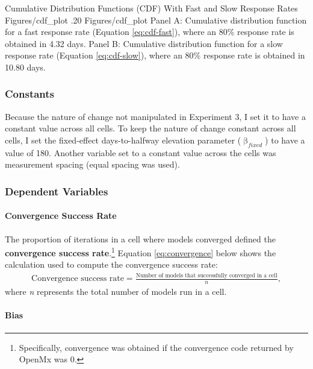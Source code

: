 \documentclass[
12pt, %
twoside,
english]{guelphthesis}
\theoremstyle{definition}
\theoremstyle{definition}
\theoremstyle{definition}
\theoremstyle{definition}
\theoremstyle{remark}
\begin{document}
\begin{apaFigure}
[portrait]
[samepage]
[0cm]
{Cumulative Distribution Functions (CDF) With Fast and Slow Response Rates}
{Figures/cdf_plot}
{.20}
{Figures/cdf_plot}
{Panel A: Cumulative distribution function for a fast response rate (Equation \ref{eq:cdf-fast}), where an 80\% response rate is obtained in 4.32 days. Panel B: Cumulative distribution function for a slow response rate (Equation \ref{eq:cdf-slow}), where an 80\% response rate is obtained in 10.80 days.}
\end{apaFigure}
\hypertarget{constants-2}{%
\subsubsection{Constants}\label{constants-2}}

Because the nature of change not manipulated in Experiment 3, I set it to have a constant value across all cells. To keep the nature of change constant across all cells, I set the fixed-effect days-to-halfway elevation parameter (\(\upbeta_{fixed}\)) to have a value of 180. Another variable set to a constant value across the cells was measurement spacing (equal spacing was used).

\hypertarget{dependent-variables-2}{%
\subsubsection{Dependent Variables}\label{dependent-variables-2}}

\hypertarget{convergence-success-rate-1}{%
\paragraph{Convergence Success Rate}\label{convergence-success-rate-1}}

The proportion of iterations in a cell where models converged defined
the \textbf{convergence success rate}.\footnote{Specifically, convergence was obtained if the convergence code returned by OpenMx was 0.} Equation \eqref{eq:convergence} below shows the calculation used to compute the convergence success rate:
\begin{align}
  \text{Convergence success rate} =  \frac{\text{Number of models that successfully converged in a cell}}{n},
  \label{eq:convergence} 
\end{align}
\noindent where \emph{n} represents the total number of models run in a cell.

\hypertarget{bias-1}{%
\paragraph{Bias}\label{bias-1}}
\end{document}
